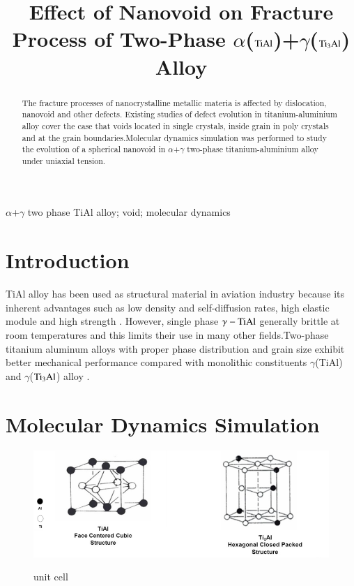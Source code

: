 \documentclass[final,5p,times,twocolumn]{elsarticle}
\begin{document}
\begin{frontmatter}
\title{Effect of Nanovoid on Fracture Process of Two-Phase $\alpha$($\rm TiAl$)+$\gamma$($\rm Ti_3Al$) Alloy}

\address[mymainaddress]{School of Mechanical and Electronical Engineering, Lanzhou University of Technology. Lanzhou 730050, China}
\begin{abstract}
 The fracture processes of nanocrystalline metallic materia is affected by dislocation, nanovoid and other defects. Existing studies of defect evolution in titanium-aluminium alloy cover the case that voids located in single crystals, inside grain in poly crystals and at the grain boundaries.Molecular dynamics simulation was performed to study the evolution of a spherical nanovoid in $\alpha$+$\gamma$ two-phase titanium-aluminium alloy under uniaxial tension.
\end{abstract}
\begin{keyword}
$\alpha$+$\gamma$ two phase TiAl alloy; void; molecular dynamics
\end{keyword}
\end{frontmatter}
\linenumbers

\section{Introduction}
TiAl alloy has been used as structural material in aviation industry because its inherent advantages such as low density and self-diffusion rates, high elastic module and high strength \cite{Xiong2015}. However, single phase $\gamma-\rm TiAl$ generally brittle at room temperatures and this limits their use in many other fields.Two-phase titanium aluminum alloys with proper phase distribution and grain size exhibit better mechanical performance compared with monolithic constituents $\gamma$(TiAl) and $\gamma$($\rm Ti_3Al$) alloy \cite{intro-structure}.

\section{Molecular Dynamics Simulation }

\begin{figure}
	\centering
	\includegraphics[width=1\linewidth]{img/cell}
	\label{fig:unit_cell}
	\caption{unit cell}
\end{figure}
\end{document}
